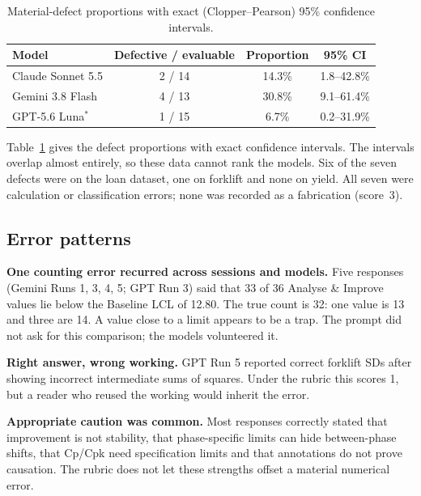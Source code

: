\documentclass[11pt]{article}
\begin{document}
\begin{table}[!htbp]
\centering\small
\caption{Material-defect proportions with exact (Clopper--Pearson) 95\% confidence intervals.}\label{tab:rates}
\begin{tabular}{@{}lccc@{}}
\toprule
Model & Defective / evaluable & Proportion & 95\% CI \\
\midrule
Claude Sonnet 5.5 & 2 / 14 & 14.3\% & 1.8--42.8\% \\
Gemini 3.8 Flash & 4 / 13 & 30.8\% & 9.1--61.4\% \\
GPT-5.6 Luna$^{*}$ & 1 / 15 & 6.7\% & 0.2--31.9\% \\
\bottomrule
\end{tabular}
\end{table}
Table~\ref{tab:rates} gives the defect proportions with exact confidence intervals. The intervals overlap almost entirely, so these data cannot rank the models. Six of the seven defects were on the loan dataset, one on forklift and none on yield. All seven were calculation or classification errors; none was recorded as a fabrication (score~3).

\subsection{Error patterns}
\textbf{One counting error recurred across sessions and models.} Five responses (Gemini Runs 1, 3, 4, 5; GPT Run 3) said that 33 of 36 Analyse \& Improve values lie below the Baseline LCL of 12.80. The true count is 32: one value is 13 and three are 14. A value close to a limit appears to be a trap. The prompt did not ask for this comparison; the models volunteered it.

\textbf{Right answer, wrong working.} GPT Run 5 reported correct forklift SDs after showing incorrect intermediate sums of squares. Under the rubric this scores 1, but a reader who reused the working would inherit the error.

\textbf{Appropriate caution was common.} Most responses correctly stated that improvement is not stability, that phase-specific limits can hide between-phase shifts, that Cp/Cpk need specification limits and that annotations do not prove causation. The rubric does not let these strengths offset a material numerical error.
\end{document}
